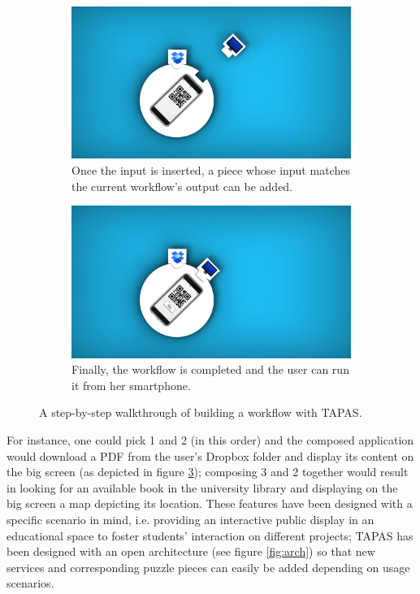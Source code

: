 \begin{figure}[ht!]
\begin{subfigure}[b]{0.48\linewidth}
  \end{subfigure}
  \begin{subfigure}[b]{0.48\linewidth}
    \centering
    \includegraphics[width=0.75\linewidth,trim={800 200 1600 200},clip]{images/c4/TAPAS-3.png} 
    \caption{Once the input is inserted, a piece whose input matches the current workflow's output can be added.}\label{fig:walkthrough:c}
  \end{subfigure}\hfill
  \begin{subfigure}[b]{0.48\linewidth}
    \centering
    \includegraphics[width=0.75\linewidth,trim={800 200 1600 200},clip]{images/c4/TAPAS-4.png} 
    \caption{Finally, the workflow is completed and the user can run it from her smartphone.}\label{fig:walkthrough:d}
  \end{subfigure}
  \caption{A step-by-step walkthrough of building a workflow with \acs{TAPAS}.}\label{fig:walkthrough}
\end{figure}

For instance, one could pick 1 and 2 (in this order) and the composed application would download a PDF from the user's Dropbox folder and display its content on the big screen (as depicted in figure \ref{fig:walkthrough}); composing 3 and 2 together would result in looking for an available book in the university library and displaying on the big screen a map depicting its location. These features have been designed with a specific scenario in mind, i.e. providing an interactive public display in an educational space to foster students' interaction on different projects; \acs{TAPAS} has been designed with an open architecture (see figure \ref{fig:arch}) so that new services and corresponding puzzle pieces can easily be added depending on usage scenarios.

